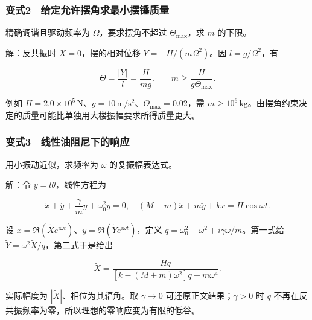 \documentclass[12pt,a4paper,fontset=fandol]{ctexart}
\begin{document}
\subsubsection{变式2　给定允许摆角求最小摆锤质量}\label{ux53d8ux5f0f2-ux7ed9ux5b9aux5141ux8bb8ux6446ux89d2ux6c42ux6700ux5c0fux6446ux9524ux8d28ux91cf}

精确调谐且驱动频率为 \(\Omega\)，要求摆角不超过 \(\Theta_{\max}\)，求
\(m\) 的下限。

解：反共振时 \(X=0\)，摆的相对位移 \(Y=-H/(m\Omega^2)\)。因
\(l=g/\Omega^2\)，有

\[\Theta=\frac{|Y|}{l}=\frac H{mg}.
\qquad \boxed{m\ge\frac H{g\Theta_{\max}}.}\]

例如
\(H=2.0\times10^5\,\mathrm N\)、\(g=10\,\mathrm{m/s^2}\)、\(\Theta_{\max}=0.02\)，需
\(m\ge10^6\,\mathrm{kg}\)。由摆角约束决定的质量可能比单独用大楼振幅要求所得质量更大。

\subsubsection{变式3　线性油阻尼下的响应}\label{ux53d8ux5f0f3-ux7ebfux6027ux6cb9ux963bux5c3cux4e0bux7684ux54cdux5e94}

用小振动近似，求频率为 \(\omega\) 的复振幅表达式。

解：令 \(y=l\theta\)，线性方程为

\[\ddot x+\ddot y+\frac\gamma m\dot y+\omega_0^2y=0,
\quad (M+m)\ddot x+m\ddot y+kx=H\cos\omega t.\]

设
\(x=\Re(\widetilde X e^{i\omega t})\)、\(y=\Re(\widetilde Y e^{i\omega t})\)，定义
\(q=\omega_0^2-\omega^2+i\gamma\omega/m\)。第一式给
\(\widetilde Y=\omega^2\widetilde X/q\)，第二式于是给出

\[\boxed{\widetilde X=
\frac{Hq}{[k-(M+m)\omega^2]q-m\omega^4}.}\]

实际幅度为 \(|\widetilde X|\)、相位为其辐角。取 \(\gamma\to0\)
可还原正文结果；\(\gamma>0\) 时 \(q\)
不再在反共振频率为零，所以理想的零响应变为有限的低谷。
\end{document}
